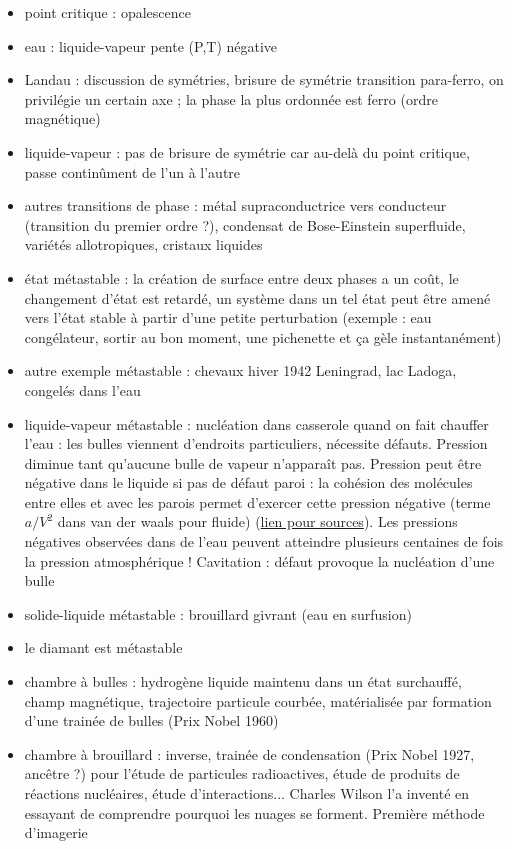 \begin{remarques} \begin{itemize}
\item point critique : opalescence
\item eau : liquide-vapeur pente (P,T) négative 
\item Landau : discussion de symétries, brisure de symétrie transition para-ferro, on privilégie un certain axe ; la phase la plus ordonnée est ferro (ordre magnétique)
\item liquide-vapeur : pas de brisure de symétrie car au-delà du point critique, passe continûment de l'un à l'autre
\item autres transitions de phase : métal supraconductrice vers conducteur (transition du premier ordre ?), condensat de Bose-Einstein superfluide, variétés allotropiques, cristaux liquides
\item état métastable : la création de surface entre deux phases a un coût, le changement d'état est retardé, un système dans un tel état peut être amené vers l'état stable à partir d'une petite perturbation (exemple : eau congélateur, sortir au bon moment, une pichenette et ça gèle instantanément)
\item autre exemple métastable : chevaux hiver 1942 Leningrad, lac Ladoga, congelés dans l'eau
\item liquide-vapeur métastable : nucléation dans casserole quand on fait chauffer l'eau : les bulles viennent d'endroits particuliers, nécessite défauts. Pression diminue tant qu’aucune bulle de vapeur n’apparaît pas. Pression peut être négative dans le liquide si pas de défaut paroi : la cohésion des molécules entre elles et avec les parois  permet d’exercer cette pression négative (terme $a/V^2$ dans van der waals pour fluide) (\href{https://www-liphy.univ-grenoble-alpes.fr/pagesperso/marmottant/Publications_files/ArticleFinalCouverturePlusArticle.pdf}{lien pour sources}). Les pressions négatives observées dans de l’eau peuvent atteindre plusieurs centaines de fois la pression atmosphérique ! Cavitation : défaut provoque la nucléation d'une bulle
\item solide-liquide métastable : brouillard givrant (eau en surfusion)
\item le diamant est métastable
\item chambre à bulles : hydrogène liquide maintenu dans un état surchauffé, champ magnétique, trajectoire particule courbée, matérialisée par formation d'une trainée de bulles (Prix Nobel 1960)
\item chambre à brouillard : inverse, trainée de condensation (Prix Nobel 1927, ancêtre ?) pour l'étude de particules radioactives, étude  de produits de réactions nucléaires, étude d'interactions... Charles Wilson l'a inventé en essayant de comprendre pourquoi les nuages se forment. Première méthode d'imagerie

\end{itemize}
\end{remarques}
